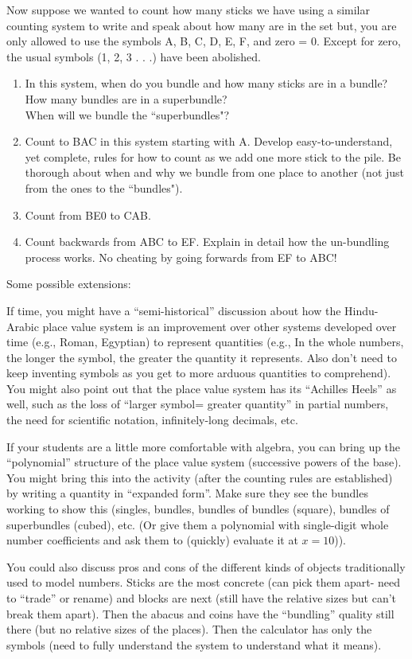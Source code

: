 \documentclass{ximera}
\begin{document}
\begin{problem}
 Now suppose we wanted to count how many sticks we have using a similar counting system to write and speak about how many are in the set but, you are only allowed to use the symbols A, B, C, D, E, F, and zero = 0. Except for zero, the usual symbols (1, 2, 3 . . .) have been abolished.
\begin{enumerate}
\item In this system, when do you bundle and how many sticks are in a bundle?\\ How many bundles are in a superbundle?  \\
When will we bundle the ``superbundles"?  
\item Count to BAC in this system starting with A.   Develop easy-to-understand, yet complete, rules for how to count as we add one more stick to the pile.  Be thorough about when and why we bundle from one place to another (not just from the ones to the ``bundles").
\item Count from BE0 to CAB.  
\item Count backwards from ABC to EF. Explain in detail how the un-bundling process works. No cheating by going forwards from EF to ABC!  
\end{enumerate}

\begin{instructorNotes}
Some possible extensions:

If time, you might have a ``semi-historical'' discussion about how the Hindu-Arabic place value system is an improvement over other systems developed over time (e.g., Roman, Egyptian) to represent quantities (e.g., In the whole numbers, the longer the symbol, the greater the quantity it represents.  Also don't need to keep inventing symbols as you get to more arduous quantities to comprehend).  You might also point out that the place value system has its ``Achilles Heels'' as well, such as the loss of ``larger symbol= greater quantity'' in partial numbers, the need for scientific notation, infinitely-long decimals, etc.  

If your students are a little more comfortable with algebra, you can bring up the ``polynomial'' structure of the place value system (successive powers of the base).  You might bring this into the activity (after the counting rules are established) by writing a quantity in ``expanded form''.  Make sure they see the bundles working to show this (singles, bundles, bundles of bundles (square), bundles of superbundles (cubed), etc. (Or give them a polynomial with single-digit whole number coefficients and ask them to (quickly) evaluate it at $x = 10$)).

You could also discuss pros and cons of the different kinds of objects traditionally used to model numbers.  Sticks are the most concrete (can pick them apart- need to ``trade'' or rename) and blocks are next (still have the relative sizes but can't break them apart).  Then the abacus and coins have the ``bundling'' quality still there (but no relative sizes of the places).  Then the calculator has only the symbols (need to fully understand the system to understand what it means).

\end{instructorNotes}
\end{problem}
\end{document}
